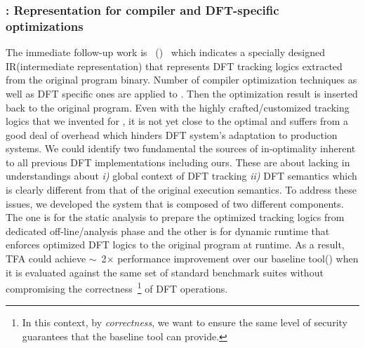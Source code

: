 \documentclass[letterpaper, 10pt]{article}
\begin{document}
\begin{small}
\subsubsection*{\TFAFull: Representation for compiler and DFT-specific optimizations}
The immediate follow-up work is \TFAFull~(\TFA)~\cite{tfa:2012ndss} which
indicates a specially designed IR(intermediate representation) that represents
DFT tracking logics extracted from the original program binary.  Number of
compiler optimization techniques as well as DFT specific ones are applied to
\TFA. Then the optimization result is inserted back to the original program. 
%
Even with the highly crafted/customized tracking logics that we invented for
\libdft, it is not yet close to the optimal and suffers from a good deal of
overhead which hinders DFT system's adaptation to production systems. We could
identify two fundamental the sources of in-optimality inherent to all
previous DFT implementations including ours. These are about lacking in
understandings about {\it i)} global context of DFT tracking {\it ii)} DFT
semantics which is clearly different from that of the original execution
semantics.
%
To address these issues, we developed the system that is composed of two
different components. The one is for the static analysis to prepare the
optimized tracking logics from dedicated off-line/analysis phase and the other
is for dynamic runtime that enforces optimized DFT logics to the original
program  at runtime.
%
As a result, TFA could achieve \(\sim\)~2\(\times\) performance improvement
over  our baseline tool(\libdft) when it is evaluated against the same set of
standard benchmark suites without compromising the correctness~\footnote{In
        this context, by {\it correctness}, we want to ensure the same level of
security guarantees that the baseline tool \libdft can provide.} of DFT
operations.


\end{small}
\end{document}
